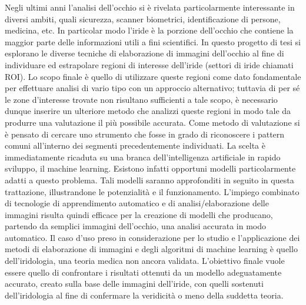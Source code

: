 Negli ultimi anni l’analisi dell’occhio si è rivelata particolarmente interessante in diversi ambiti, quali sicurezza, scanner biometrici, identificazione di persone, medicina, etc. In particolar modo l’iride è la porzione dell’occhio che contiene la maggior parte delle informazioni utili a fini scientifici. In questo progetto di tesi si esplorano le diverse tecniche di elaborazione di immagini dell’occhio al fine di individuare ed estrapolare regioni di interesse dell’iride (settori di iride chiamati ROI). Lo scopo finale è quello di utilizzare queste regioni come dato fondamentale per effettuare analisi di vario tipo con un approccio alternativo; tuttavia di per sé le zone d’interesse trovate non risultano sufficienti a tale scopo, è necessario dunque inserire un ulteriore metodo che analizzi queste regioni in modo tale da produrre una valutazione il più possibile accurata. Come metodo di valutazione si è pensato di cercare uno strumento che fosse in grado di riconoscere i pattern comuni all’interno dei segmenti precedentemente individuati. La scelta è immediatamente ricaduta su una branca dell’intelligenza artificiale in rapido sviluppo, il machine learning. Esistono infatti opportuni modelli particolarmente adatti a questo problema. Tali modelli saranno approfonditi in seguito in questa trattazione, illustrandone le potenzialità e il funzionamento. L’impiego combinato di tecnologie di apprendimento automatico e di analisi/elaborazione delle immagini risulta quindi efficace per la creazione di modelli che producano, partendo da semplici immagini dell’occhio, una analisi accurata in modo automatico. Il caso d’uso preso in considerazione per lo studio e l’applicazione dei metodi di elaborazione di immagini e degli algoritmi di machine learning è quello dell’iridologia, una teoria medica non ancora validata. L’obiettivo finale vuole essere quello di confrontare i risultati ottenuti da un modello adeguatamente accurato, creato sulla base delle immagini dell’iride, con quelli sostenuti dell'iridologia al fine di confermare la veridicità o meno della suddetta teoria.
 

